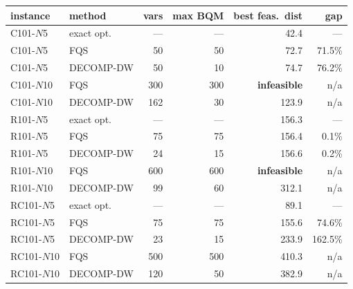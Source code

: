 \begin{tabular}{llrrrr}
\toprule
instance & method & vars & max BQM & best feas.\ dist & gap \\
\midrule
C101-$N$5 & exact opt. & --- & --- & 42.4 & --- \\
C101-$N$5 & FQS & 50 & 50 & 72.7 & 71.5\% \\
C101-$N$5 & DECOMP-DW & 50 & 10 & 74.7 & 76.2\% \\
\addlinespace[2pt]
C101-$N$10 & FQS & 300 & 300 & \textbf{infeasible} & n/a \\
C101-$N$10 & DECOMP-DW & 162 & 30 & 123.9 & n/a \\
\addlinespace[2pt]
R101-$N$5 & exact opt. & --- & --- & 156.3 & --- \\
R101-$N$5 & FQS & 75 & 75 & 156.4 & 0.1\% \\
R101-$N$5 & DECOMP-DW & 24 & 15 & 156.6 & 0.2\% \\
\addlinespace[2pt]
R101-$N$10 & FQS & 600 & 600 & \textbf{infeasible} & n/a \\
R101-$N$10 & DECOMP-DW & 99 & 60 & 312.1 & n/a \\
\addlinespace[2pt]
RC101-$N$5 & exact opt. & --- & --- & 89.1 & --- \\
RC101-$N$5 & FQS & 75 & 75 & 155.6 & 74.6\% \\
RC101-$N$5 & DECOMP-DW & 23 & 15 & 233.9 & 162.5\% \\
\addlinespace[2pt]
RC101-$N$10 & FQS & 500 & 500 & 410.3 & n/a \\
RC101-$N$10 & DECOMP-DW & 120 & 50 & 382.9 & n/a \\
\bottomrule
\end{tabular}